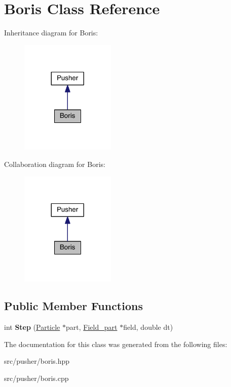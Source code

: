 \hypertarget{class_boris}{}\section{Boris Class Reference}
\label{class_boris}


Inheritance diagram for Boris\+:
\nopagebreak
\begin{figure}[H]
\begin{center}
\leavevmode
\includegraphics[width=128pt]{class_boris__inherit__graph}
\end{center}
\end{figure}


Collaboration diagram for Boris\+:
\nopagebreak
\begin{figure}[H]
\begin{center}
\leavevmode
\includegraphics[width=128pt]{class_boris__coll__graph}
\end{center}
\end{figure}
\subsection*{Public Member Functions}
\begin{DoxyCompactItemize}
\item 
\hypertarget{class_boris_a1cf5027803211109530e12ddd434ef5c}{}\label{class_boris_a1cf5027803211109530e12ddd434ef5c} 
int {\bfseries Step} (\hyperlink{struct_particle}{Particle} $\ast$part, \hyperlink{struct_field__part}{Field\+\_\+part} $\ast$field, double dt)
\end{DoxyCompactItemize}


The documentation for this class was generated from the following files\+:\begin{DoxyCompactItemize}
\item 
src/pusher/boris.\+hpp\item 
src/pusher/boris.\+cpp\end{DoxyCompactItemize}
